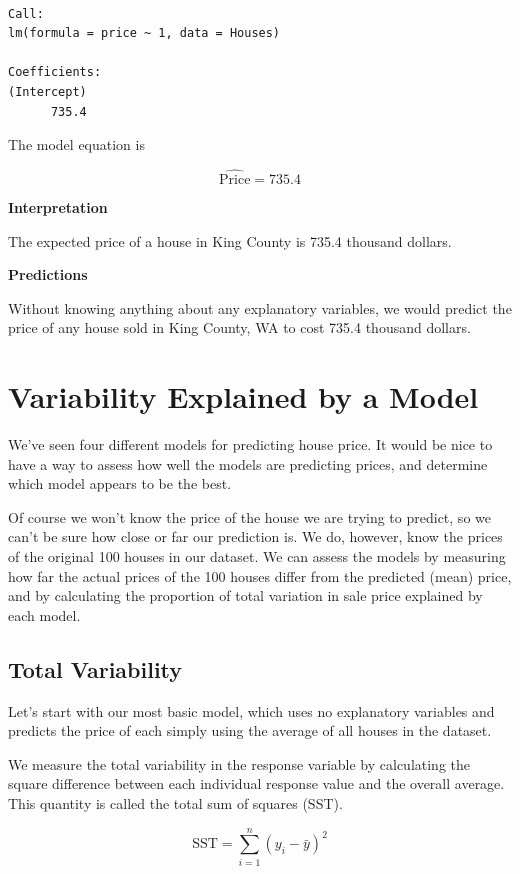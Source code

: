 \documentclass[
  letterpaper,
  DIV=11,
  numbers=noendperiod]{scrreprt}
\begin{document}
\begin{verbatim}

Call:
lm(formula = price ~ 1, data = Houses)

Coefficients:
(Intercept)  
      735.4  
\end{verbatim}

The model equation is

\[
\widehat{\text{Price}} = 735.4
\]

\textbf{Interpretation}

The expected price of a house in King County is 735.4 thousand dollars.

\textbf{Predictions}

Without knowing anything about any explanatory variables, we would
predict the price of any house sold in King County, WA to cost 735.4
thousand dollars.

\section{Variability Explained by a
Model}\label{variability-explained-by-a-model}

We've seen four different models for predicting house price. It would be
nice to have a way to assess how well the models are predicting prices,
and determine which model appears to be the best.

Of course we won't know the price of the house we are trying to predict,
so we can't be sure how close or far our prediction is. We do, however,
know the prices of the original 100 houses in our dataset. We can assess
the models by measuring how far the actual prices of the 100 houses
differ from the predicted (mean) price, and by calculating the
proportion of total variation in sale price explained by each model.

\subsection{Total Variability}\label{total-variability}

Let's start with our most basic model, which uses no explanatory
variables and predicts the price of each simply using the average of all
houses in the dataset.

We measure the total variability in the response variable by calculating
the square difference between each individual response value and the
overall average. This quantity is called the total sum of squares (SST).

\[
\text{SST} = \displaystyle\sum_{i=1}^n (y_i - \bar{y})^2
\]
\end{document}
